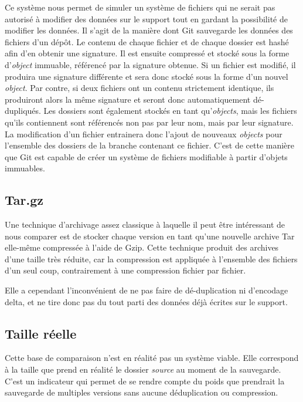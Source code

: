 \documentclass[a4paper]{report}
\begin{document}
Ce système nous permet de simuler un système de fichiers qui ne serait
pas autorisé à modifier des données sur le support tout en gardant la
possibilité de modifier les données. Il s'agit de la manière dont Git
sauvegarde les données des fichiers d'un dépôt. Le contenu de chaque
fichier et de chaque dossier est hashé afin d'en obtenir une signature.
Il est ensuite compressé et stocké sous la forme d'\emph{object}
immuable, référencé par la signature obtenue. Si un fichier est modifié,
il produira une signature différente et sera donc stocké sous la forme
d'un nouvel \emph{object}. Par contre, si deux fichiers ont un contenu
strictement identique, ils produiront alors la même signature et seront
donc automatiquement dé-dupliqués. Les dossiers sont également stockés
en tant qu'\emph{objects}, mais les fichiers qu'ils contiennent sont
référencés non pas par leur nom, mais par leur signature. La
modification d'un fichier entrainera donc l'ajout de nouveaux
\emph{objects} pour l'ensemble des dossiers de la branche contenant ce
fichier. C'est de cette manière que Git est capable de créer un système
de fichiers modifiable à partir d'objets immuables.

\subsection{Tar.gz}

Une technique d'archivage assez classique à laquelle il peut être
intéressant de nous comparer est de stocker chaque version en tant
qu'une nouvelle archive Tar elle-même compressée à l'aide de Gzip. Cette
technique produit des archives d'une taille très réduite, car la
compression est appliquée à l'ensemble des fichiers d'un seul coup,
contrairement à une compression fichier par fichier.

Elle a cependant l'inconvénient de ne pas faire de dé-duplication ni
d'encodage delta, et ne tire donc pas du tout parti des données déjà
écrites sur le support.

\subsection{Taille réelle}

Cette base de comparaison n'est en réalité pas un système viable. Elle
correspond à la taille que prend en réalité le dossier \emph{source} au
moment de la sauvegarde. C'est un indicateur qui permet de se rendre
compte du poids que prendrait la sauvegarde de multiples versions sans
aucune déduplication ou compression.
\end{document}

